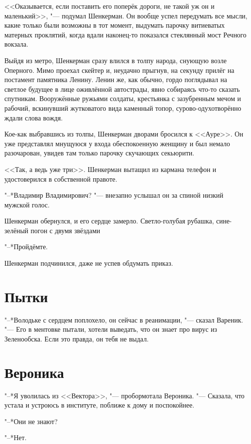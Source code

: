 <<Оказывается, если поставить его поперёк дороги, не такой уж он и маленький>>, "--- подумал Шенкерман.
Он вообще успел передумать все мысли, какие только были возможны в тот момент, выдумать парочку витиеватых матерных проклятий, когда вдали наконец-то показался стеклянный мост Речного вокзала.

Выйдя из метро, Шенкерман сразу влился в толпу народа, снующую возле Оперного.
Мимо проехал скейтер и, неудачно прыгнув, на секунду прилёг на постамент памятника Ленину.
Ленин же, как обычно, гордо поглядывал на светлое будущее в лице оживлённой автострады, явно собираясь что-то сказать спутникам.
Вооружённые ружьями солдаты, крестьянка с зазубренным мечом и рабочий, вскинувший жутковатого вида каменный топор, сурово-одухотворённо ждали слова вождя.

Кое-как выбравшись из толпы, Шенкерман дворами бросился к <<Ауре>>.
Он уже представлял мнущуюся у входа обеспокоенную женщину и был немало разочарован, увидев там только парочку скучающих секьюрити.

<<Так, а ведь уже три>>.
Шенкерман вытащил из кармана телефон и удостоверился в собственной правоте.

"--*Владимир Владимирович? "--- внезапно услышал он за спиной низкий мужской голос.

Шенкерман обернулся, и его сердце замерло.
Светло-голубая рубашка, сине-зелёный погон с двумя звёздами\ldotst

"--*Пройдёмте.

Шенкерман подчинился, даже не успев обдумать приказ.

\section{Пытки}

"--*Володьке с сердцем поплохело, он сейчас в реанимации, "--- сказал Вареник.
"--- Его в ментовке пытали, хотели выведать, что он знает про вирус из Зеленообска.
Если это правда, он тебя не выдал.

\section{Вероника}

"--*Я уволилась из <<Вектора>>, "--- пробормотала Вероника.
"--- Сказала, что устала и устроюсь в институте, поближе к дому и поспокойнее.

"--*Они не знают?

"--*Нет.

